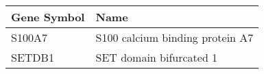 \begin{tabular}{ll}
\toprule
Gene Symbol &                            Name \\
\midrule
     S100A7 & S100 calcium binding protein A7 \\
     SETDB1 &         SET domain bifurcated 1 \\
\bottomrule
\end{tabular}
